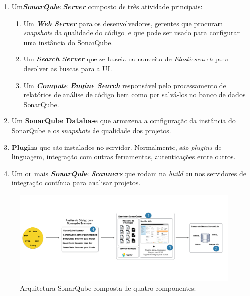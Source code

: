 \begin{enumerate}
\item Um\textbf{\textit{SonarQube Server}} composto de três atividade principais:
	\begin{enumerate}
	\item Um \textbf{\textit{Web Server}} para os desenvolvedores, gerentes que procuram \textit{snapshots} da qualidade do código, e que pode ser usado para configurar uma instância do SonarQube.
	\item Um \textbf{\textit{Search Server}} que se baseia no conceito de \textit{Elasticsearch} para devolver as buscas para a UI.
	\item Um \textbf{\textit{Compute Engine Search}} responsável pelo processamento de relatórios de análise de código bem como por salvá-los no banco de dados SonarQube.
	\end{enumerate}
\item Um \textbf{SonarQube Database} que armazena a configuração da instância do SonarQube e os \textit{snapshots} de qualidade dos projetos.
\item \textbf{Plugins} que são instalados no servidor. Normalmente, são \textit{plugins} de linguagem, integração com outras ferramentas, autenticações entre outros.
\item Um ou mais \textbf{\textit{SonarQube Scanners}} que rodam na \textit{build} ou nos servidores de integração contínua para analisar projetos.
\end{enumerate}
\graphicspath{{figuras/}}
\begin{figure}[h]
\centering
\includegraphics[scale=0.2]{Arq_Sonar}
\caption{Arquitetura SonarQube composta de quatro componentes: \cite{sonar}}
\label{img:arq_sonar}
\end{figure}

